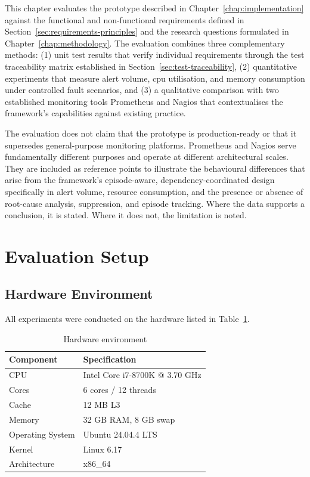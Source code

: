 This chapter evaluates the prototype described in Chapter~\ref{chap:implementation} against the functional and non-functional requirements defined in Section~\ref{sec:requirements-principles} and the research questions formulated in Chapter~\ref{chap:methodology}. The evaluation combines three complementary methods: (1) unit test results that verify individual requirements through the test traceability matrix established in Section~\ref{sec:test-traceability}, (2) quantitative experiments that measure alert volume, \gls{cpu} utilisation, and memory consumption under controlled fault scenarios, and (3) a qualitative comparison with two established monitoring tools Prometheus and Nagios that contextualises the framework's capabilities against existing practice.

The evaluation does not claim that the prototype is production-ready or that it supersedes general-purpose monitoring platforms. Prometheus and Nagios serve fundamentally different purposes and operate at different architectural scales. They are included as reference points to illustrate the behavioural differences that arise from the framework's episode-aware, dependency-coordinated design specifically in alert volume, resource consumption, and the presence or absence of root-cause analysis, suppression, and episode tracking. Where the data supports a conclusion, it is stated. Where it does not, the limitation is noted.

\section{Evaluation Setup}\label{sec:eval-setup}

\subsection{Hardware Environment}

All experiments were conducted on the hardware listed in Table~\ref{tab:hardware-env}.

\begin{table}[htbp]
\centering
\caption{Hardware environment}
\label{tab:hardware-env}
\begin{tabular}{p{4cm} p{9cm}}
\toprule
Component & Specification \\
\midrule
CPU & Intel Core i7-8700K @ 3.70 GHz \\
Cores & 6 cores / 12 threads \\
Cache & 12 MB L3 \\
Memory & 32 GB RAM, 8 GB swap \\
Operating System & Ubuntu 24.04.4 LTS \\
Kernel & Linux 6.17 \\
Architecture & x86\_64 \\
\bottomrule
\end{tabular}
\end{table}

